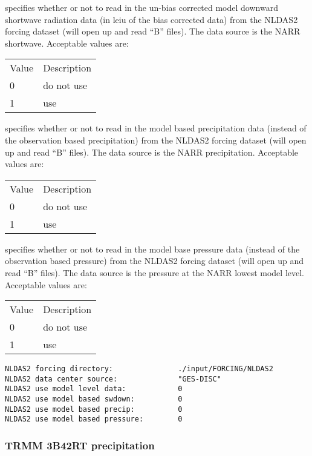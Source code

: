   specifies whether or not to
 read in the un-bias corrected model downward shortwave radiation 
 data (in leiu of the bias corrected data) from the NLDAS2 forcing
 dataset (will open up and read ``B'' files).  The data source is
 the NARR shortwave.
 Acceptable values are:

 \begin{tabular}{ll}
 Value & Description \\
 0     & do not use  \\
 1     & use         \\
 \end{tabular}

  specifies whether or not
 to read in the model based precipitation data (instead of the 
 observation based precipitation) from the NLDAS2 forcing  
 dataset (will open up and read ``B'' files).  The data source
 is the NARR precipitation.
 Acceptable values are:

 \begin{tabular}{ll}
 Value & Description \\
 0     & do not use  \\
 1     & use         \\
 \end{tabular}

  specifies whether or
 not to read in the model base pressure data (instead of the 
 observation based pressure) from the NLDAS2 forcing dataset
 (will open up and read ``B'' files).  The data source is
 the pressure at the NARR lowest model level.
 Acceptable values are:

 \begin{tabular}{ll}
 Value & Description \\
 0     & do not use  \\
 1     & use         \\
 \end{tabular}
 

 \begin{Verbatim}[frame=single]
NLDAS2 forcing directory:               ./input/FORCING/NLDAS2
NLDAS2 data center source:              "GES-DISC"
NLDAS2 use model level data:            0
NLDAS2 use model based swdown:          0
NLDAS2 use model based precip:          0
NLDAS2 use model based pressure:        0
 \end{Verbatim}

 
 \subsubsection{TRMM 3B42RT precipitation} \label{sssec:supp_3b42rt}
 

